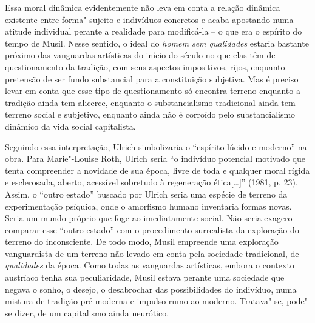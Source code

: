 Essa moral dinâmica evidentemente não leva em conta a relação dinâmica
existente entre forma"-sujeito e indivíduos concretos e acaba apostando
numa atitude individual perante a realidade para modificá-la -- o que
era o espírito do tempo de Musil. Nesse sentido, o ideal do \emph{homem
sem qualidades} estaria bastante próximo das vanguardas artísticas do
início do século  no que elas têm de questionamento da tradição, com
seus aspectos impositivos, rijos, enquanto pretensão de ser fundo
substancial para a constituição subjetiva. Mas é preciso levar em conta
que esse tipo de questionamento só encontra terreno enquanto a tradição
ainda tem alicerce, enquanto o substancialismo tradicional ainda tem
terreno social e subjetivo, enquanto ainda não é corroído pelo
substancialismo dinâmico da vida social capitalista.

Seguindo essa interpretação, Ulrich simbolizaria o ``espírito lúcido e
moderno'' na obra. Para Marie"-Louise Roth, Ulrich seria ``o indivíduo
potencial motivado que tenta compreender a novidade de sua época, livre
de toda e qualquer moral rígida e esclerosada, aberto, acessível
sobretudo à regeneração ética[\ldots{}]'' (1981, p. 23). Assim, o ``outro
estado'' buscado por Ulrich seria uma espécie de terreno da
experimentação psíquica, onde o amorfismo humano inventaria formas
novas. Seria um mundo próprio que foge ao imediatamente social. Não
seria exagero comparar esse ``outro estado'' com o procedimento
surrealista da exploração do terreno do inconsciente. De todo modo,
Musil empreende uma exploração vanguardista de um terreno não levado em
conta pela sociedade tradicional, de \emph{qualidades} da época. Como
todas as vanguardas artísticas, embora o contexto austríaco tenha sua
peculiaridade, Musil estava perante uma sociedade que negava o sonho, o
desejo, o desabrochar das possibilidades do indivíduo, numa mistura de
tradição pré-moderna e impulso rumo ao moderno. Tratava"-se, pode"-se
dizer, de um capitalismo ainda neurótico.


